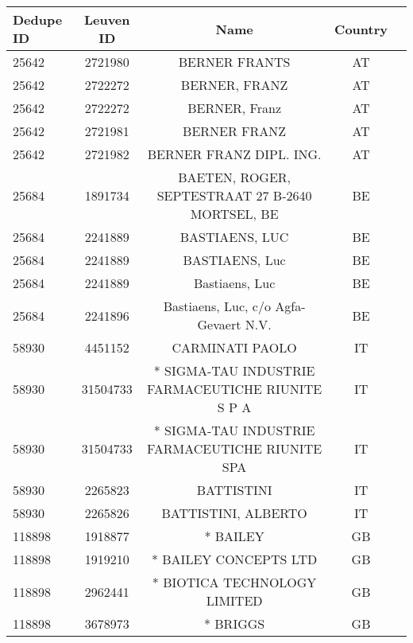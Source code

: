 \begin{longtable}{|l|c|c|c|c|}
\hline
 Dedupe ID &  Leuven ID &                                               Name & Country \\
\hline
     25642 &    2721980 &                                      BERNER FRANTS &      AT \\
     25642 &    2722272 &                                      BERNER, FRANZ &      AT \\
     25642 &    2722272 &                                      BERNER, Franz &      AT \\
     25642 &    2721981 &                                       BERNER FRANZ &      AT \\
     25642 &    2721982 &                            BERNER FRANZ DIPL. ING. &      AT \\
     25684 &    1891734 &   BAETEN, ROGER, SEPTESTRAAT 27 B-2640 MORTSEL, BE &      BE \\
     25684 &    2241889 &                                     BASTIAENS, LUC &      BE \\
     25684 &    2241889 &                                     BASTIAENS, Luc &      BE \\
     25684 &    2241889 &                                     Bastiaens, Luc &      BE \\
     25684 &    2241896 &              Bastiaens, Luc, c/o Agfa-Gevaert N.V. &      BE \\
     58930 &    4451152 &                                    CARMINATI PAOLO &      IT \\
     58930 &   31504733 &  * SIGMA-TAU INDUSTRIE FARMACEUTICHE RIUNITE S P A &      IT \\
     58930 &   31504733 &    * SIGMA-TAU INDUSTRIE FARMACEUTICHE RIUNITE SPA &      IT \\
     58930 &    2265823 &                                         BATTISTINI &      IT \\
     58930 &    2265826 &                                BATTISTINI, ALBERTO &      IT \\
    118898 &    1918877 &                                           * BAILEY &      GB \\
    118898 &    1919210 &                              * BAILEY CONCEPTS LTD &      GB \\
    118898 &    2962441 &                       * BIOTICA TECHNOLOGY LIMITED &      GB \\
    118898 &    3678973 &                                           * BRIGGS &      GB \\

\end{longtable}

